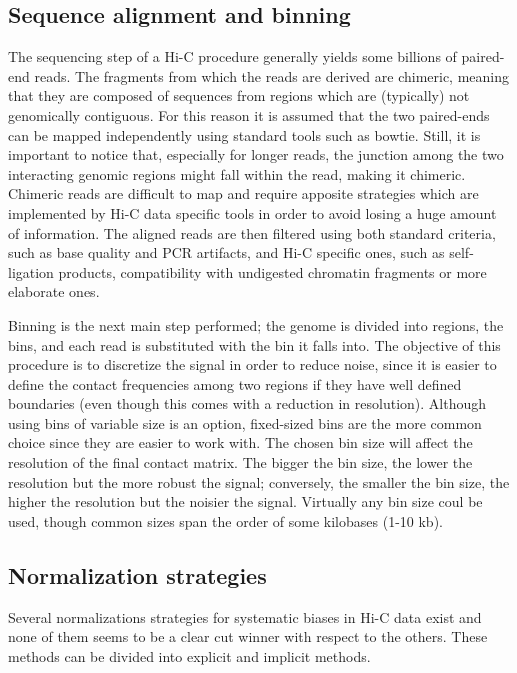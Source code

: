 \subsection{Sequence alignment and binning}
The sequencing step of a Hi-C procedure generally yields some billions of paired-end reads. The fragments from which the reads are derived are chimeric, meaning that they are composed of sequences from regions which are (typically) not genomically contiguous. For this reason it is assumed that the two paired-ends can be mapped independently using standard tools such as bowtie. Still, it is important to notice that, especially for longer reads, the junction among the two interacting genomic regions might fall within the read, making it chimeric. Chimeric reads are difficult to map and require apposite strategies which are implemented by Hi-C data specific tools in order to avoid losing a huge amount of information. The aligned reads are then filtered using both standard criteria, such as base quality and PCR artifacts, and Hi-C specific ones, such as self-ligation products, compatibility with undigested chromatin fragments\cite{readfiltering2013} or more elaborate ones\cite{complexfiltering2017}.

Binning is the next main step performed; the genome is divided into regions, the bins, and each read is substituted with the bin it falls into. The objective of this procedure is to discretize the signal in order to reduce noise, since it is easier to define the contact frequencies among two regions if they have well defined boundaries (even though this comes with a reduction in resolution).
Although using bins of variable size is an option, fixed-sized bins are the more common choice since they are easier to work with. The chosen bin size will affect the resolution of the final contact matrix. The bigger the bin size, the lower the resolution but the more robust the signal; conversely, the smaller the bin size, the higher the resolution but the noisier the signal. Virtually any bin size coul be used, though common sizes span the order of some kilobases (1-10 kb).

\subsection{Normalization strategies}
Several normalizations strategies for systematic biases in Hi-C data exist and none of them seems to be a clear cut winner with respect to the others\cite{normalization2020}. These methods can be divided into explicit and implicit methods. 

